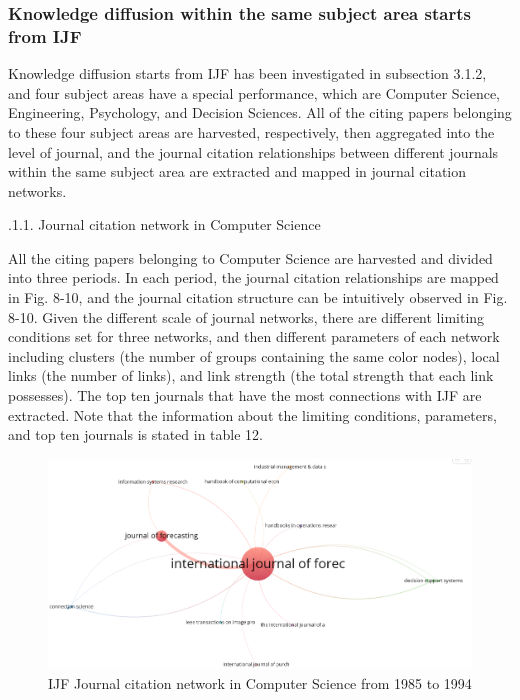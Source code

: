 \documentclass[11pt,a4paper]{elsarticle} %
\begin{document}
\subsubsection{Knowledge diffusion within the same subject area starts
from
IJF}\label{knowledge-diffusion-within-the-same-subject-area-starts-from-ijf}

Knowledge diffusion starts from IJF has been investigated in subsection
3.1.2, and four subject areas have a special performance, which are
Computer Science, Engineering, Psychology, and Decision Sciences. All of
the citing papers belonging to these four subject areas are harvested,
respectively, then aggregated into the level of journal, and the journal
citation relationships between different journals within the same
subject area are extracted and mapped in journal citation networks.

.1.1. Journal citation network in Computer Science

All the citing papers belonging to Computer Science are harvested and
divided into three periods. In each period, the journal citation
relationships are mapped in Fig. 8-10, and the journal citation
structure can be intuitively observed in Fig. 8-10. Given the different
scale of journal networks, there are different limiting conditions set
for three networks, and then different parameters of each network
including clusters (the number of groups containing the same color
nodes), local links (the number of links), and link strength (the total
strength that each link possesses). The top ten journals that have the
most connections with IJF are extracted. Note that the information about
the limiting conditions, parameters, and top ten journals is stated in
table 12.

\begin{figure}[!htbp]
\centering
\includegraphics[scale=0.3]{fig.8.eps}
\caption{ IJF Journal citation network in Computer Science from 1985 to 1994}
\end{figure}
\end{document}
